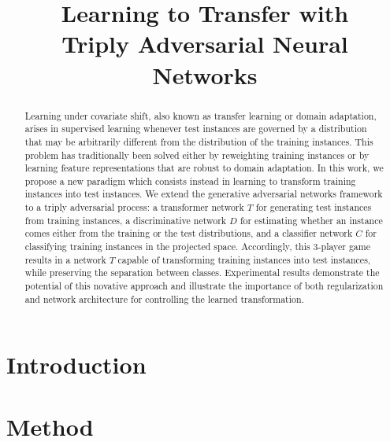 \documentclass[aoas,preprint,authoryear]{imsart}
\begin{document}
\begin{frontmatter}
\title{Learning to Transfer with\\
       Triply Adversarial Neural Networks}


\author{ }

\begin{abstract}

Learning under covariate shift, also known as transfer learning or domain
adaptation, arises in supervised learning whenever test instances are governed
by a distribution that may be arbitrarily different from the distribution of the
training instances. This problem has traditionally been solved either by
reweighting training instances or by learning feature representations that are
robust to domain adaptation. In this work, we propose a new paradigm which
consists instead in learning to transform training instances into test
instances. We extend the generative adversarial networks framework
\citep{goodfellow2014generative} to a triply adversarial process: a transformer
network $T$ for generating test instances from training instances, a
discriminative network $D$ for estimating whether an instance comes either from
the training or the test distributions, and a classifier network $C$ for
classifying training instances in the projected space. Accordingly, this
3-player game results in a network $T$ capable of transforming training
instances into test instances, while preserving the separation between classes.
Experimental results demonstrate the potential of this novative approach and
illustrate the importance of both regularization and network architecture for
controlling the learned transformation.

\end{abstract}

\end{frontmatter}

\section{Introduction}

\section{Method}
\end{document}
